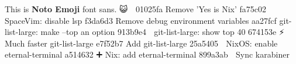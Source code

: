 \documentclass{article}
\begin{document}
  This is \textbf{Noto Emoji} font sans.
{  😺 👅 }\newline
{\texttt\newline
01025fa Remove 'Yes is Nix'\newline
fa75c02 {🔧} SpaceVim: disable lsp\newline
f3da6d3 Remove debug environment variables\newline
aa27fcf git-list-large: make --top an option\newline
913b9e4 {🔧} git-list-large: show top 40\newline
674153e {⚡️} Much faster git-list-large\newline
e7f52b7 Add git-list-large\newline
25a5405 {🔧} NixOS: enable eternal-terminal\newline
a514632 {➕} Nix: add eternal-terminal\newline
899a3ab {🔧} Sync karabiner\newline
}
\end{document}
